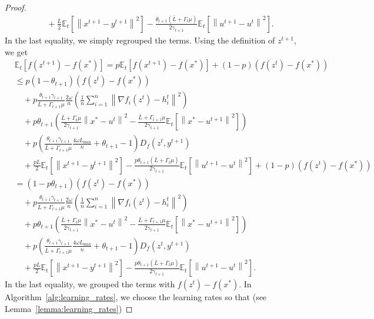 \documentclass{article} %
\newcommand{\norm}[1]{\left\| #1 \right\|}
\newcommand{\ExpSub}[2]{{\mathbb{E}}_{#1}\left[#2\right]}
\theoremstyle{plain}
\theoremstyle{definition}
\theoremstyle{remark}
\begin{document}
\begin{proof}
\begin{equation*}
\begin{aligned}
    &\quad+ \frac{L}{2} \ExpSub{t}{\norm{x^{t+1} - y^{t+1}}^2} - \frac{\theta_{t+1} \left(\bar{L} + \Gamma_{t} \mu\right)}{2 \gamma_{t+1}} \ExpSub{t}{\norm{u^{t+1} - u^t}^2}.
  \end{aligned}
\end{equation*}
In the last equality, we simply regrouped the terms.
Using the definition of $z^{t+1},$ we get
\begin{align*}
  &\ExpSub{t}{f(z^{t+1}) - f(x^*)} = p\ExpSub{t}{f(x^{t+1}) - f(x^*)} + (1 - p) \left(f(z^t) - f(x^*)\right) \\
  &\leq p(1 - \theta_{t+1}) \left(f(z^{t}) - f(x^*)\right) \\
  &\quad + p\frac{\theta_{t+1} \gamma_{t+1}}{\bar{L} + \Gamma_{t+1} \mu} \frac{2 \omega}{n} \left(\frac{1}{n}\sum_{i=1}^n \norm{\nabla f_i(z^{t}) - h_i^t}^2\right) \\
  &\quad+ p\theta_{t+1} \left(\frac{\bar{L} + \Gamma_{t} \mu}{2 \gamma_{t+1}} \norm{x^* - u^t}^2 - \frac{\bar{L} + \Gamma_{t+1} \mu}{2 \gamma_{t+1}} \ExpSub{t}{\norm{x^* - u^{t+1}}^2}\right) \\
  &\quad+ p\left(\frac{\theta_{t+1} \gamma_{t+1}}{\bar{L} + \Gamma_{t+1} \mu} \frac{4 \omega L_{\max}}{n} + \theta_{t+1} - 1 \right) D_f(z^t, y^{t+1}) \\
  &\quad+ \frac{pL}{2} \ExpSub{t}{\norm{x^{t+1} - y^{t+1}}^2} - \frac{p \theta_{t+1} \left(\bar{L} + \Gamma_{t} \mu\right)}{2 \gamma_{t+1}} \ExpSub{t}{\norm{u^{t+1} - u^t}^2} + (1 - p) \left(f(z^t) - f(x^*)\right) \\
  &= (1 - p\theta_{t+1}) \left(f(z^{t}) - f(x^*)\right) \\
  &\quad + p\frac{\theta_{t+1} \gamma_{t+1}}{\bar{L} + \Gamma_{t+1} \mu} \frac{2 \omega}{n} \left(\frac{1}{n}\sum_{i=1}^n \norm{\nabla f_i(z^{t}) - h_i^t}^2\right) \\
  &\quad+ p\theta_{t+1} \left(\frac{\bar{L} + \Gamma_{t} \mu}{2 \gamma_{t+1}} \norm{x^* - u^t}^2 - \frac{\bar{L} + \Gamma_{t+1} \mu}{2 \gamma_{t+1}} \ExpSub{t}{\norm{x^* - u^{t+1}}^2}\right) \\
  &\quad+ p\left(\frac{\theta_{t+1} \gamma_{t+1}}{\bar{L} + \Gamma_{t+1} \mu} \frac{4 \omega L_{\max}}{n} + \theta_{t+1} - 1 \right) D_f(z^t, y^{t+1}) \\
  &\quad+ \frac{pL}{2} \ExpSub{t}{\norm{x^{t+1} - y^{t+1}}^2} - \frac{p \theta_{t+1} \left(\bar{L} + \Gamma_{t} \mu\right)}{2 \gamma_{t+1}} \ExpSub{t}{\norm{u^{t+1} - u^t}^2}.
\end{align*}
In the last equality, we grouped the terms with $f(z^{t}) - f(x^*).$ In Algorithm~\ref{alg:learning_rates}, we choose the learning rates so that (see Lemma~\ref{lemma:learning_rates})

\end{proof}
\end{document}

